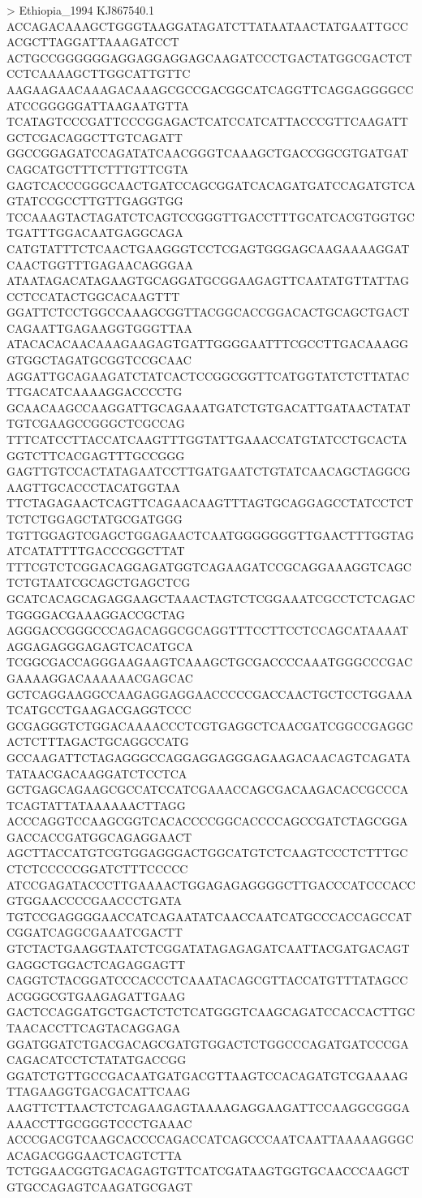 > Ethiopia_1994 KJ867540.1
ACCAGACAAAGCTGGGTAAGGATAGATCTTATAATAACTATGAATTGCCACGCTTAGGATTAAAGATCCT
ACTGCCGGGGGGAGGAGGAGGAGCAAGATCCCTGACTATGGCGACTCTCCTCAAAAGCTTGGCATTGTTC
AAGAAGAACAAAGACAAAGCGCCGACGGCATCAGGTTCAGGAGGGGCCATCCGGGGGATTAAGAATGTTA
TCATAGTCCCGATTCCCGGAGACTCATCCATCATTACCCGTTCAAGATTGCTCGACAGGCTTGTCAGATT
GGCCGGAGATCCAGATATCAACGGGTCAAAGCTGACCGGCGTGATGATCAGCATGCTTTCTTTGTTCGTA
GAGTCACCCGGGCAACTGATCCAGCGGATCACAGATGATCCAGATGTCAGTATCCGCCTTGTTGAGGTGG
TCCAAAGTACTAGATCTCAGTCCGGGTTGACCTTTGCATCACGTGGTGCTGATTTGGACAATGAGGCAGA
CATGTATTTCTCAACTGAAGGGTCCTCGAGTGGGAGCAAGAAAAGGATCAACTGGTTTGAGAACAGGGAA
ATAATAGACATAGAAGTGCAGGATGCGGAAGAGTTCAATATGTTATTAGCCTCCATACTGGCACAAGTTT
GGATTCTCCTGGCCAAAGCGGTTACGGCACCGGACACTGCAGCTGACTCAGAATTGAGAAGGTGGGTTAA
ATACACACAACAAAGAAGAGTGATTGGGGAATTTCGCCTTGACAAAGGGTGGCTAGATGCGGTCCGCAAC
AGGATTGCAGAAGATCTATCACTCCGGCGGTTCATGGTATCTCTTATACTTGACATCAAAAGGACCCCTG
GCAACAAGCCAAGGATTGCAGAAATGATCTGTGACATTGATAACTATATTGTCGAAGCCGGGCTCGCCAG
TTTCATCCTTACCATCAAGTTTGGTATTGAAACCATGTATCCTGCACTAGGTCTTCACGAGTTTGCCGGG
GAGTTGTCCACTATAGAATCCTTGATGAATCTGTATCAACAGCTAGGCGAAGTTGCACCCTACATGGTAA
TTCTAGAGAACTCAGTTCAGAACAAGTTTAGTGCAGGAGCCTATCCTCTTCTCTGGAGCTATGCGATGGG
TGTTGGAGTCGAGCTGGAGAACTCAATGGGGGGGTTGAACTTTGGTAGATCATATTTTGACCCGGCTTAT
TTTCGTCTCGGACAGGAGATGGTCAGAAGATCCGCAGGAAAGGTCAGCTCTGTAATCGCAGCTGAGCTCG
GCATCACAGCAGAGGAAGCTAAACTAGTCTCGGAAATCGCCTCTCAGACTGGGGACGAAAGGACCGCTAG
AGGGACCGGGCCCAGACAGGCGCAGGTTTCCTTCCTCCAGCATAAAATAGGAGAGGGAGAGTCACATGCA
TCGGCGACCAGGGAAGAAGTCAAAGCTGCGACCCCAAATGGGCCCGACGAAAAGGACAAAAAACGAGCAC
GCTCAGGAAGGCCAAGAGGAGGAACCCCCGACCAACTGCTCCTGGAAATCATGCCTGAAGACGAGGTCCC
GCGAGGGTCTGGACAAAACCCTCGTGAGGCTCAACGATCGGCCGAGGCACTCTTTAGACTGCAGGCCATG
GCCAAGATTCTAGAGGGCCAGGAGGAGGGAGAAGACAACAGTCAGATATATAACGACAAGGATCTCCTCA
GCTGAGCAGAAGCGCCATCCATCGAAACCAGCGACAAGACACCGCCCATCAGTATTATAAAAAACTTAGG
ACCCAGGTCCAAGCGGTCACACCCCGGCACCCCAGCCGATCTAGCGGAGACCACCGATGGCAGAGGAACT
AGCTTACCATGTCGTGGAGGGACTGGCATGTCTCAAGTCCCTCTTTGCCTCTCCCCCGGATCTTTCCCCC
ATCCGAGATACCCTTGAAAACTGGAGAGAGGGGCTTGACCCATCCCACCGTGGAACCCCGAACCCTGATA
TGTCCGAGGGGAACCATCAGAATATCAACCAATCATGCCCACCAGCCATCGGATCAGGCGAAATCGACTT
GTCTACTGAAGGTAATCTCGGATATAGAGAGATCAATTACGATGACAGTGAGGCTGGACTCAGAGGAGTT
CAGGTCTACGGATCCCACCCTCAAATACAGCGTTACCATGTTTATAGCCACGGGCGTGAAGAGATTGAAG
GACTCCAGGATGCTGACTCTCTCATGGGTCAAGCAGATCCACCACTTGCTAACACCTTCAGTACAGGAGA
GGATGGATCTGACGACAGCGATGTGGACTCTGGCCCAGATGATCCCGACAGACATCCTCTATATGACCGG
GGATCTGTTGCCGACAATGATGACGTTAAGTCCACAGATGTCGAAAAGTTAGAAGGTGACGACATTCAAG
AAGTTCTTAACTCTCAGAAGAGTAAAAGAGGAAGATTCCAAGGCGGGAAAACCTTGCGGGTCCCTGAAAC
ACCCGACGTCAAGCACCCCAGACCATCAGCCCAATCAATTAAAAAGGGCACAGACGGGAACTCAGTCTTA
TCTGGAACGGTGACAGAGTGTTCATCGATAAGTGGTGCAACCCAAGCTGTGCCAGAGTCAAGATGCGAGT
